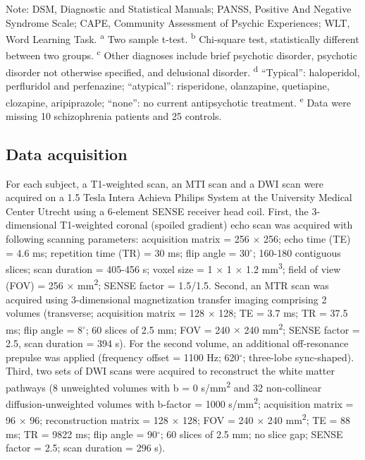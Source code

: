 \begin{refsection}
\begin{table}
\begin{flushleft}
\footnotesize
Note: DSM, Diagnostic and Statistical Manuals; PANSS, Positive And Negative Syndrome Scale; CAPE, Community Assessment of Psychic Experiences; WLT, Word Learning Task. \textsuperscript{a} Two sample t-test. \textsuperscript{b} Chi-square test, statistically different between two groups.
\textsuperscript{c} Other diagnoses include brief psychotic disorder, psychotic disorder not otherwise specified, and delusional disorder. \textsuperscript{d} “Typical”: haloperidol, perfluridol and perfenazine; “atypical”: risperidone, olanzapine, quetiapine, clozapine, aripiprazole; “none”: no current antipsychotic treatment. \textsuperscript{e} Data were missing 10 schizophrenia patients and 25 controls.
\end{flushleft}
\label{mtrtable1}
\end{table}

\subsection*{Data acquisition}
For each subject, a T1-weighted scan, an MTI scan and a DWI scan were acquired on a 1.5 Tesla Intera Achieva Philips System at the University Medical Center Utrecht using a 6-element SENSE receiver head coil. First, the 3-dimensional T1-weighted coronal (spoiled gradient) echo scan was acquired with following scanning parameters: acquisition matrix = 256 $\times$ 256; echo time (TE) = 4.6 ms; repetition time (TR) = 30 ms; flip angle = 30$^{\circ}$; 160-180 contiguous slices; scan duration = 405-456 s; voxel size = 1 $\times$ 1 $\times$ 1.2 mm\textsuperscript{3}; field of view (FOV) = 256 $\times$ mm\textsuperscript{2}; SENSE factor = 1.5/1.5. Second, an MTR scan was acquired using 3-dimensional magnetization transfer imaging comprising 2 volumes (transverse; acquisition matrix = 128 $\times$ 128; TE = 3.7 ms; TR = 37.5 ms; flip angle = 8$^{\circ}$; 60 slices of 2.5 mm; FOV = 240 $\times$ 240 mm\textsuperscript{2}; SENSE factor = 2.5, scan duration = 394 s). For the second volume, an additional off-resonance prepulse was applied (frequency offset = 1100 Hz; 620$^{\circ}$; three-lobe sync-shaped). Third, two sets of DWI scans were acquired to reconstruct the white matter pathways (8 unweighted volumes with b = 0 s/mm\textsuperscript{2} and 32 non-collinear diffusion-unweighted volumes with b-factor = 1000 s/mm\textsuperscript{2}; acquisition matrix = 96 $\times$ 96; reconstruction matrix = 128 $\times$ 128; FOV = 240 $\times$ 240 mm\textsuperscript{2}; TE = 88 ms; TR = 9822 ms; flip angle = 90$^{\circ}$; 60 slices of 2.5 mm; no slice gap; SENSE factor = 2.5; scan duration = 296 s).


\end{refsection}
